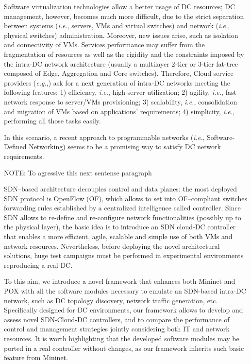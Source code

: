\documentclass[12pt,english]{book}
\begin{document}
Software virtualization technologies allow a better usage of DC resources; DC management, however, becomes much more difficult, due to the strict separation between systems (\textit{i.e.}, servers, VMs and virtual switches) and network (\textit{i.e.}, physical switches) administration.
Moreover, new issues arise, such as isolation and connectivity of VMs.
Services performance may suffer from the fragmentation of resources as well as the rigidity and the constraints imposed by the intra-DC network architecture (usually a multilayer 2-tier or 3-tier fat-tree composed of Edge, Aggregation and Core switches\cite{dc_arch}).
Therefore, Cloud service providers (\textit{e.g.},\cite{amazon}) ask for a next generation of intra-DC networks meeting the following features: 1) efficiency, \textit{i.e.}, high server utilization; 2) agility, \textit{i.e.}, fast network response to server/VMs provisioning; 3) scalability, \textit{i.e.}, consolidation and migration of VMs based on applications' requirements; 4) simplicity, \textit{i.e.}, performing all those tasks easily\cite{baldonado}.

In this scenario, a recent approach to programmable networks (\textit{i.e.}, Software-Defined Networking) seems to be a promising way to satisfy DC network requirements\cite{ibmnec}. 

NOTE: To agressive this next sentense paragraph

SDN--based architecture decouples control and data planes: the most deployed SDN protocol is OpenFlow (OF)\cite{openflow}\cite{onf}, which allows to set into OF--compliant switches forwarding rules established by a centralized intelligence called controller.
Since SDN allows to re-define and re-configure network functionalities (possibly up to the physical layer), the basic idea is to introduce an SDN cloud-DC controller that enables a more efficient, agile, scalable and simple use of both VMs and network resources. Nevertheless, before deploying the novel architectural solutions, huge test campaigns must be performed in experimental environments reproducing a real DC.

To this aim, we introduce a novel framework that enhances both Mininet\cite{mininet} and POX\cite{pox} with all the software modules necessary to emulate an SDN-based intra-DC network, such as DC topology discovery, network traffic generation, etc. Specifically designed for DC environments, our framework allows to develop and assess novel SDN-Cloud-DC controllers, and to compare the performance of control and management strategies jointly considering both IT and network resources\cite{im2013}. It is worth highlighting that the developed software modules may be ported in a real controller without changes, as our framework inherits such basic feature from Mininet.
\end{document}
